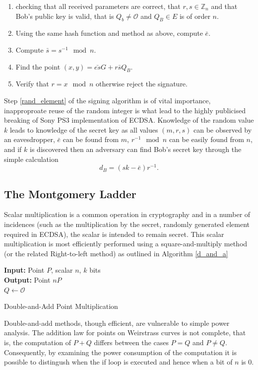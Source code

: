 \documentclass{llncs}
\newcommand{\Z}{{\mathbb Z}}
\begin{document}
\begin{enumerate}
\item checking that all received parameters are correct, that $r,s\in\Z_n$ and that Bob's public key is valid, that is $Q_b\neq \mathcal{O}$ and $Q_B\in E$ is of order $n$.
\item Using the same hash function and method as above, compute $\bar{e}$.
\item Compute $\bar{s}=s^{-1}\mod n$.
\item Find the point $(x,y)=\bar{es}G+r\bar{s}Q_B$.
\item Verify that $r=x\mod n$ otherwise reject the signature.
\end{enumerate}

Step \ref{rand_element} of the signing algorithm is of vital importance, inapproproate reuse of the random integer is what lead to the highly publicised breaking of Sony PS3 implementation of ECDSA. Knowledge of the random value $k$ leads to knowledge of the secret key as all values $(m,r,s)$ can be observed by an eavesdropper, $\bar{e}$ can be found from $m$, $r^{-1}\mod n$ can be easily found from $n$, and if $k$ is discovered then an adversary can find Bob's secret key through the simple calculation $$d_B=(sk-\bar{e})r^{-1}.$$


\subsection{The Montgomery Ladder}\label{sub:montgomery}
Scalar multiplication is a common operation in cryptography and in a number of incidences (such as the multiplication by the secret, randomly generated element required in ECDSA), the scalar is intended to remain secret. This scalar multiplication is most efficiently performed using a square-and-multiply method (or the related Right-to-left method) as outlined in Algorithm \ref{d_and_a}

\begin{algorithm}[htb]\label{d_and_a}
\SetAlgoLined
{\bf Input:} Point $P$, scalar $n$, $k$ bits\\
{\bf Output:} Point $nP$\\
$Q\gets \mathcal{O}$\\
 \caption{Double-and-Add Point Multiplication}
\end{algorithm}
Double-and-add methods, though efficient, are vulnerable to simple power analysis. The addition law for points on Weirstrass curves is not complete, that is, the computation of $P+Q$ differs between the cases $P=Q$ and $P\neq Q.$ Consequently, by examining the power consumption of the computation it is possible to distingush when the if loop is executed and hence when a bit of $n$ is 0.
\end{document}
